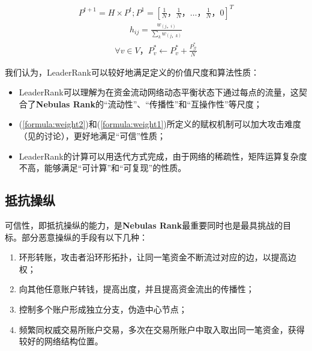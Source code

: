 \begin{align} \label{formula:iteration}
	P^{t+1} = H \times P^{t}; P^1=[\frac{1}{N}， \frac{1}{N}， \dots， \frac{1}{N}， 0]^T
\end{align}
\begin{align} \label{formula:matrix}
	h_{ij} = \frac{w_{(j，i)}}{\sum_k w_{(j，k)}}
\end{align}
\begin{align} \label{formula:init}
\forall v \in V， P^*_v \leftarrow P^*_v + \frac{P^*_{\mathcal{G}}}{N}
\end{align}


我们认为，LeaderRank可以较好地满足定义的价值尺度和算法性质：
\begin{itemize}
	\item LeaderRank可以理解为在资金流动网络动态平衡状态下通过每点的流量，这契合了\textbf{Nebulas Rank}的“流动性”、“传播性”和“互操作性”等尺度；
	\item (\ref{formula:weight2})和(\ref{formula:weight1})所定义的赋权机制可以加大攻击难度（见的讨论），更好地满足“可信”性质；
	\item LeaderRank的计算可以用迭代方式完成，由于网络的稀疏性，矩阵运算复杂度不高，能够满足“可计算”和“可复现”的性质。
\end{itemize}


\subsection{抵抗操纵}\label{subsec:robust}

可信性，即抵抗操纵的能力，是\textbf{Nebulas Rank}最重要同时也是最具挑战的目标。部分恶意操纵的手段有以下几种：
\begin{enumerate}
	\item 环形转账，攻击者沿环形拓扑，让同一笔资金不断流过对应的边，以提高边权；
	\item 向其他任意账户转钱，提高出度，并且提高资金流出的传播性；
	\item 控制多个账户形成独立分支，伪造中心节点；
	\item 频繁同权威交易所账户交易，多次在交易所账户中取入取出同一笔资金，获得较好的网络结构位置。
\end{enumerate}

